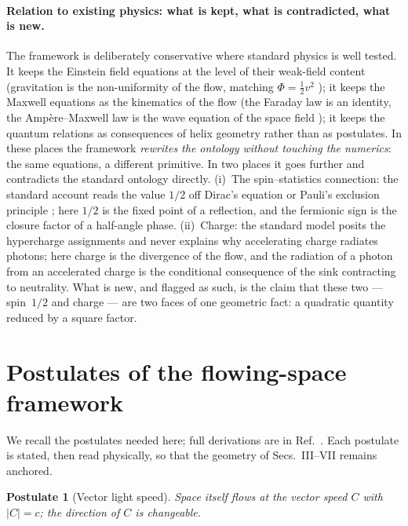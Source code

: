 \documentclass[aps,prd,preprint,superscriptaddress,amsmath,amssymb]{revtex4-2}
\newtheorem{postulate}{Postulate}[section]
\begin{document}
\paragraph{Relation to existing physics: what is kept, what is
contradicted, what is new.}
The framework is deliberately conservative where standard physics is
well tested.  It keeps the Einstein field equations at the level of
their weak-field content (gravitation is the non-uniformity of the
flow, matching $\Phi=\tfrac12 v^2$ \cite{einstein1915feldgleichungen,
gordon1923lichtfortpflanzung}); it keeps the Maxwell equations as the
kinematics of the flow (the Faraday law is an identity, the
Amp\`ere--Maxwell law is the wave equation of the space field
\cite{maxwell1996dynamical}); it keeps the quantum relations
\cite{planck1978gesetz,de1924recherches,heisenberg1927anschaulichen}
as consequences of helix geometry rather than as postulates.  In these
places the framework \emph{rewrites the ontology without touching the
numerics}: the same equations, a different primitive.  In two places it
goes further and contradicts the standard ontology directly.  (i)~The
spin--statistics connection: the standard account reads the value
$1/2$ off Dirac's equation \cite{dirac1928quantum} or Pauli's exclusion
principle \cite{pauli1925zusammenhang}; here $1/2$ is the fixed point
of a reflection, and the fermionic sign is the closure factor of a
half-angle phase.  (ii)~Charge: the standard model posits the
hypercharge assignments and never explains why accelerating charge
radiates photons; here charge is the divergence of the flow, and the
radiation of a photon from an accelerated charge is the conditional
consequence of the sink contracting to neutrality.  What is new, and
flagged as such, is the claim that these two --- spin~$1/2$ and
charge --- are two faces of one geometric fact: a quadratic quantity
reduced by a square factor.

\section{Postulates of the flowing-space framework}
\label{sec:postulates}

We recall the postulates needed here; full derivations are in
Ref.~\cite{ProjectionPhysics}.  Each postulate is stated, then read
physically, so that the geometry of Secs.~III--VII remains anchored.

\begin{postulate}[Vector light speed]
\label{post:sls}
Space itself flows at the vector speed $C$ with $|C|=c$; the
direction of $C$ is changeable.
\end{postulate}
\end{document}
